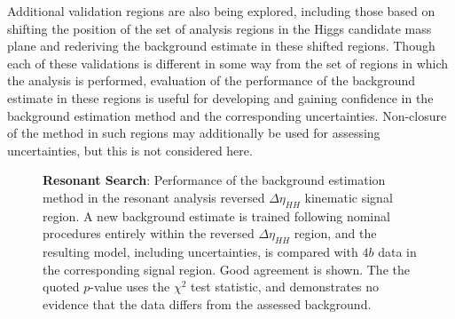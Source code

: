 Additional validation regions are also being explored, including those based on shifting the 
position of the set of analysis regions in the Higgs candidate mass plane and rederiving 
the background estimate in these shifted regions. Though each of these validations is different 
in some way from the set of regions in which the analysis is performed, evaluation of the performance 
of the background estimate in these regions is useful for developing and gaining confidence in the 
background estimation method and the corresponding uncertainties. Non-closure of the method in such 
regions may additionally be used for assessing uncertainties, but this is not considered here.

\begin{figure}[ht]
	\centering
	\caption{\label{fig:res-rev-deta} \textbf{Resonant Search}: Performance of the background estimation method in the 
	resonant analysis reversed $\Delta \eta_{HH}$ kinematic signal region. A new background estimate is trained 
	following nominal procedures entirely within the reversed $\Delta \eta_{HH}$ region, and the resulting model, 
	including uncertainties, is compared with $4b$ data in the corresponding signal region. Good agreement is shown. The 
	the quoted $p$-value uses the $\chi^{2}$ test statistic, and demonstrates no evidence that the data differs from the 
	assessed background.}
\end{figure}

